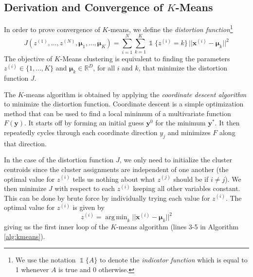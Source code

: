 \documentclass[final,3p,times,twocolumn]{elsarticle}
\DeclareMathOperator*{\argmin}{arg\,min}
\let\bs\boldsymbol
\DeclareMathOperator*{\id}{\mathds{1}}
\begin{document}
\subsection{Derivation and Convergence of $K$-Means}
\label{sect:kmeans-derivation}
In order to prove convergence of $K$-means, we define the \emph{distortion function}\footnote{We use the notation $\id\{A\}$ to denote the \emph{indicator function} which is equal to 1 whenever $A$ is true and 0 otherwise.} 
\begin{equation*}
J(z^{(1)},\dots,z^{(N)},\bs\mu_1,\dots,\bs\mu_K) = \sum_{i=1}^N \sum_{k=1}^K \id\{z^{(i)}=k\}\,||\bs x^{(i)} - \bs \mu_k||^2
\end{equation*}
The objective of $K$-Means clustering is equivalent to finding the parameters $z^{(i)} \in \{1,\dots,K\}$ and $\bs\mu_k\in\mathbb{R}^D$, for all $i$ and $k$, that minimize the distortion function $J$.

The $K$-means algorithm is obtained by applying the \emph{coordinate descent algorithm} to minimize the distortion function.
Coordinate descent is a simple optimization method that can be used to find a local minimum of a multivariate function $F(\bs y)$.
It starts off by forming an initial guess $\bs y^{0}$ for the minimum $\bs y^*$. 
It then repeatedly cycles through each coordinate direction $y_j$ and minimizes $F$ along that direction.

In the case of the distortion function $J$, we only need to initialize the cluster centroids since the cluster assignments are independent of one another (the optimal value for $z^{(i)}$ tells us nothing about what $z^{(j)}$ should be if $i\neq j$).
We then minimize $J$ with respect to each $z^{(i)}$ keeping all other variables constant. 
This can be done by brute force by individually trying each value for $z^{(i)}$.
The optimal value for $z^{(i)}$ is given by
\begin{equation}
\label{eqn:kmeans-E}
z^{(i)} = \argmin_k ||\bs x^{(i)} - \bs\mu_k||^2
\end{equation}
giving us the first inner loop of the $K$-means algorithm (lines 3-5 in Algorithm \ref{alg:kmeans}).
\end{document}
